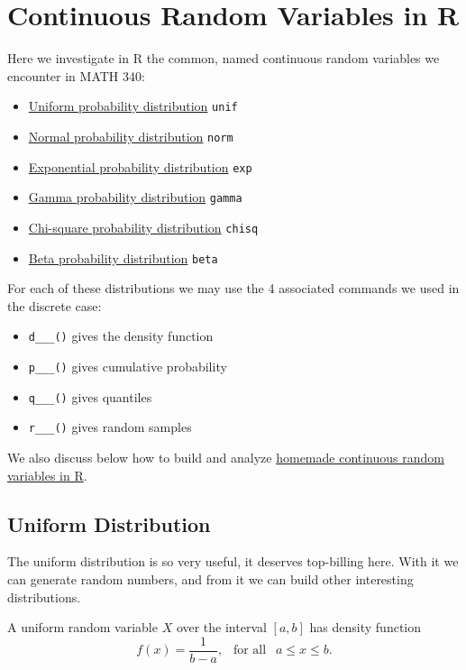 \documentclass[
]{book}
\providecommand{\tightlist}{%
  \setlength{\itemsep}{0pt}\setlength{\parskip}{0pt}}
\theoremstyle{definition}
\theoremstyle{definition}
\theoremstyle{definition}
\theoremstyle{definition}
\theoremstyle{remark}
\begin{document}
\chapter{Continuous Random Variables in R}\label{R-continuousRV}

Here we investigate in R the common, named continuous random variables we encounter in MATH 340:

\begin{itemize}
\tightlist
\item
  \hyperref[unifR]{Uniform probability distribution} \textbar{} \texttt{unif}
\item
  \hyperref[normalR]{Normal probability distribution} \textbar{} \texttt{norm}
\item
  \hyperref[expR]{Exponential probability distribution} \textbar{} \texttt{exp}
\item
  \hyperref[gammaR]{Gamma probability distribution} \textbar{} \texttt{gamma}
\item
  \hyperref[chiR]{Chi-square probability distribution} \textbar{} \texttt{chisq}
\item
  \hyperref[betaR]{Beta probability distribution} \textbar{} \texttt{beta}
\end{itemize}

For each of these distributions we may use the 4 associated commands we used in the discrete case:

\begin{itemize}
\tightlist
\item
  \texttt{d\_\_\_()} gives the density function
\item
  \texttt{p\_\_\_()} gives cumulative probability
\item
  \texttt{q\_\_\_()} gives quantiles
\item
  \texttt{r\_\_\_()} gives random samples
\end{itemize}

We also discuss below how to build and analyze \hyperref[custom-continuous-R]{homemade continuous random variables in R}.

\section{Uniform Distribution}\label{unifR}

The uniform distribution is so very useful, it deserves top-billing here. With it we can generate random numbers, and from it we can build other interesting distributions.

A uniform random variable \(X\) over the interval \([a,b]\) has density function \[f(x) = \frac{1}{b-a}, ~~\text{ for all }~~ a \leq x \leq b.\]
\end{document}
